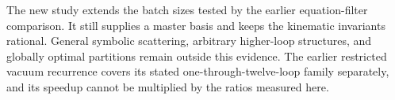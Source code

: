 The new study extends the batch sizes tested by the earlier equation-filter comparison. It still supplies a master basis and keeps the kinematic invariants rational. General symbolic scattering, arbitrary higher-loop structures, and globally optimal partitions remain outside this evidence. The earlier restricted vacuum recurrence covers its stated one-through-twelve-loop family separately, and its speedup cannot be multiplied by the ratios measured here.
